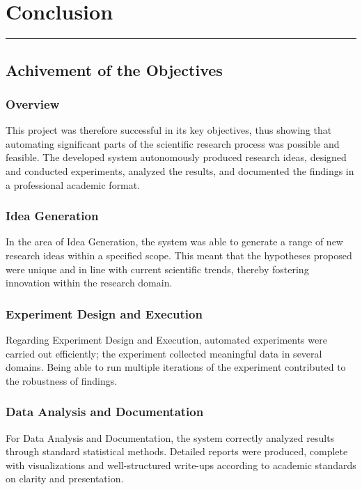 \chapter{Conclusion}
\vspace{-1.5cm}
\hspace{-1cm}\rule{19cm}{0.4pt} 

\section{Achivement of the Objectives}
\subsection{Overview}
This project was therefore successful in its key objectives, thus showing that automating significant parts of the scientific research process was possible and feasible. The developed system autonomously produced research ideas, designed and conducted experiments, analyzed the results, and documented the findings in a professional academic format.

\subsection{Idea Generation}
In the area of Idea Generation, the system was able to generate a range of new research ideas within a specified scope. This meant that the hypotheses proposed were unique and in line with current scientific trends, thereby fostering innovation within the research domain.

\subsection{Experiment Design and Execution}
Regarding Experiment Design and Execution, automated experiments were carried out efficiently; the experiment collected meaningful data in several domains. Being able to run multiple iterations of the experiment contributed to the robustness of findings.

\subsection{Data Analysis and Documentation}
For Data Analysis and Documentation, the system correctly analyzed results through standard statistical methods. Detailed reports were produced, complete with visualizations and well-structured write-ups according to academic standards on clarity and presentation.

